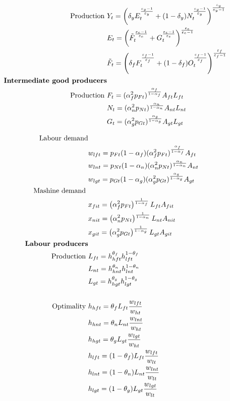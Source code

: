\begin{align*}
\text{Production}\ \vspace{4mm}& 
Y_t=\left(\delta_yE_t^\frac{\varepsilon_y-1}{\varepsilon_y}+(1-\delta_y)N_t^\frac{\varepsilon_y-1}{\varepsilon_y}\right)^\frac{\varepsilon_y}{\varepsilon_y-1}\\
&E_t=\left(\tilde{F}_t^\frac{\varepsilon_e-1}{\varepsilon_e}+G_t^\frac{\varepsilon_e-1}{\varepsilon_e}\right)^\frac{\varepsilon_e}{\varepsilon_e-1}\\
&\tilde{F}_t=\left(\delta_fF_t^\frac{\varepsilon_f-1}{\varepsilon_f}+(1-\delta_f)O_t^\frac{\varepsilon_f-1}{\varepsilon_f}\right)^\frac{\varepsilon_f}{\varepsilon_f-1}\\
\text{\textbf{Intermediate good producers}}&\\
\text{Production}\ \vspace{4mm}& F_t= (\alpha_f^2p_{Ft})^\frac{ \alpha_f}{1-\alpha_f}A_{ft}L_{ft}\\
&N_t= (\alpha_n^2p_{Nt})^\frac{ \alpha_n}{1-\alpha_n}A_{nt}L_{nt}\\
&G_t= (\alpha_g^2p_{Gt})^\frac{ \alpha_g}{1-\alpha_g}A_{gt}L_{gt}
\end{align*}

\begin{align*}
\text{Labour demand}\\
& w_{lft}=p_{Ft}(1-\alpha_f)(\alpha_f^2p_{Ft})^\frac{\alpha_f}{1-\alpha_f}A_{ft}\\
& w_{lnt}=p_{Nt}(1-\alpha_n)(\alpha_n^2p_{Nt})^\frac{\alpha_n}{1-\alpha_n}A_{nt}\\
& w_{lgt}=p_{Gt}(1-\alpha_g)(\alpha_g^2p_{Gt})^\frac{\alpha_g}{1-\alpha_g}A_{gt}\\
\text{Mashine demand}\ \vspace{4mm}\\
&x_{fit}= \left(\alpha_f^2 p_{Ft}\right)^\frac{1}{1-\alpha_f}L_{ft}A_{fit}\\
&x_{nit}= \left(\alpha_n^2 p_{Nt}\right)^\frac{1}{1-\alpha_n}L_{nt}A_{nit}\\
&x_{git}= \left(\alpha_g^2 p_{Gt}\right)^\frac{1}{1-\alpha_g}L_{gt}A_{git}\\
\text{\textbf{Labour producers}}&\\
\text{Production}\ \vspace{4mm}& L_{ft}=h_{hft}^{\theta_{f}}h_{lft}^{1-\theta_{f}}\\
& L_{nt}=h_{hnt}^{\theta_{n}}h_{lnt}^{1-\theta_{n}}\\
& L_{gt}=h_{hgt}^{\theta_{g}}h_{lgt}^{1-\theta_{g}}\\
\ \\
\text{Optimality}\ \vspace{4mm}& h_{hft}= \theta_{f}L_{ft}\frac{w_{lft}}{w_{ht}}\\
& h_{hnt}= \theta_{n}L_{nt}\frac{w_{lnt}}{w_{ht}}\\
& h_{hgt}= \theta_{g}L_{gt}\frac{w_{lgt}}{w_{ht}}\\
& h_{lft}= (1-\theta_{f})L_{ft}\frac{w_{lft}}{w_{lt}}\\
& h_{lnt}= (1-\theta_{n}) L_{nt}\frac{w_{lnt}}{w_{lt}}\\
& h_{lgt}= (1-\theta_{g}) L_{gt}\frac{w_{lgt}}{w_{lt}}
\end{align*}

